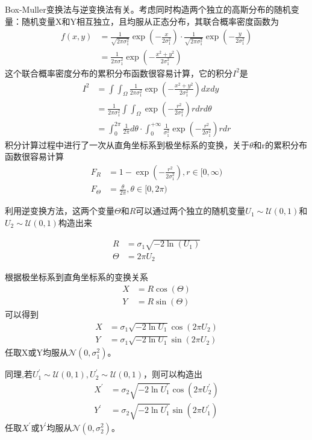\documentclass[fontset=windows]{article}
\numberwithin{figure}{section}
\begin{document}
Box-Muller变换法与逆变换法有关。考虑同时构造两个独立的高斯分布的随机变量：随机变量X和Y相互独立，且均服从正态分布，其联合概率密度函数为
\begin{align*}
	f(x,y)
	 & =\frac{1}{\sqrt{2\pi \sigma^2_1}}\exp(-\frac{x}{2\sigma^2_1})\cdot
	\frac{1}{\sqrt{2\pi\sigma^2_1}}\exp(-\frac{y}{2\sigma^2_1})           \\
	 & =\frac{1}{2\pi \sigma^2_1}\exp(-\frac{x^2+y^2}{2\sigma^2_1})
\end{align*}
这个联合概率密度分布的累积分布函数很容易计算，它的积分\(I^2\)是
\begin{align*}
	I^2
	 & =\int \int_{\Omega}\frac{1}{2\pi \sigma^2_1}\exp(-\frac{x^2+y^2}{2\sigma^2_1})dxdy   \\
	 & =\frac{1}{2\pi \sigma^2_1}\int \int_{\Omega}\exp(-\frac{r^2}{2\sigma^2_1})rdrd\theta \\
	 & =\int_{0}^{2\pi}\frac{1}{2\pi}d\theta \cdot
	\int_{0}^{+\infty}\frac{1}{\sigma^2_1}\exp(-\frac{r^2}{2\sigma^2_1})rdr
\end{align*}
积分计算过程中进行了一次从直角坐标系到极坐标系的变换，关于\(\theta\)和r的累积分布函数很容易计算
\begin{align*}
	F_R        & =1-\exp(-\frac{r^2}{2\sigma^2_1}),r\in [0,\infty) \\
	F_{\Theta} & =\frac{\theta}{2\pi },\theta\in [0,2\pi)
\end{align*}

利用逆变换方法，这两个变量\(\Theta\)和\(R\)可以通过两个独立的随机变量\(U_1\sim \mathcal{U}(0,1)\)和\(U_2\sim \mathcal{U}(0,1)\)构造出来

\begin{align*}
	R      & =\sigma_1\sqrt{-2\ln(U_1)} \\
	\Theta & =2\pi U_2
\end{align*}

根据极坐标系到直角坐标系的变换关系
\begin{align*}
	X & =R\cos(\Theta) \\
	Y & =R\sin(\Theta)
\end{align*}
可以得到
\begin{align*}
	X & =\sigma_1\sqrt{-2\ln U_1}\cos(2\pi U_2) \\
	Y & =\sigma_1\sqrt{-2\ln U_1}\sin(2\pi U_2)
\end{align*}
任取X或Y均服从\(\mathcal{N}(0,\sigma^2_1)\)。

同理,若\(U_1^{\prime}\sim \mathcal{U}(0,1),U_2^{\prime}\sim \mathcal{U}(0,1)\)，则可以构造出
\begin{align*}
	X^{\prime} & =\sigma_2\sqrt{-2\ln U_1^{\prime}}\cos(2\pi U_2^{\prime}) \\
	Y^{\prime} & =\sigma_2\sqrt{-2\ln U_1^{\prime}}\sin(2\pi U_1^{\prime})
\end{align*}
任取\(X^{\prime}\)或\(Y^{\prime}\)均服从\(\mathcal{N}(0,\sigma^2_2)\)。
\end{document}
